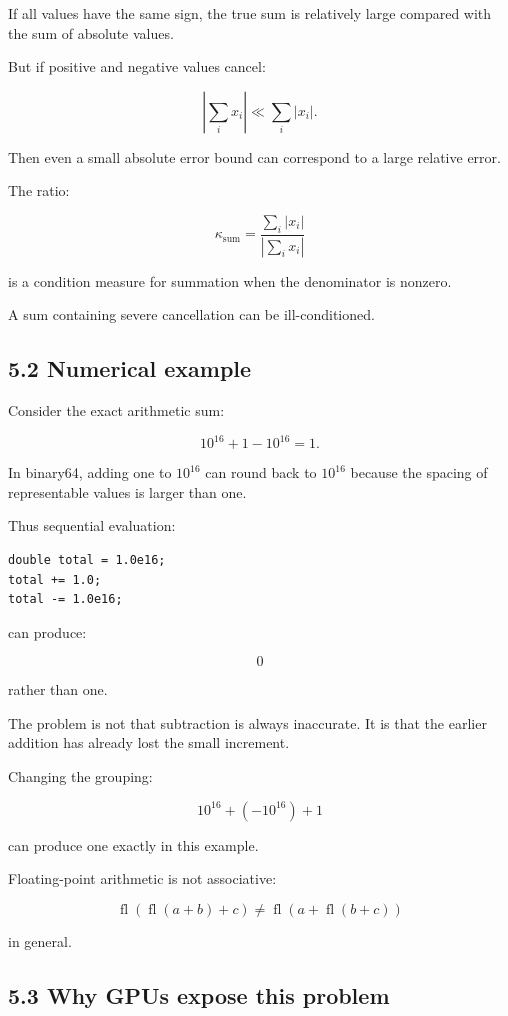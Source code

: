 If all values have the same sign, the true sum is relatively large compared with the sum of absolute values.

But if positive and negative values cancel:

\[ \left|\sum_ix_i\right| \ll \sum_i|x_i|. \]

Then even a small absolute error bound can correspond to a large relative error.

The ratio:

\[ \boxed{ \kappa_{\mathrm{sum}} = \frac{\sum_i|x_i|} {\left|\sum_ix_i\right|} } \]

is a condition measure for summation when the denominator is nonzero.

A sum containing severe cancellation can be ill-conditioned.

\subsection{5.2 Numerical example}\label{02-foundations-ii-ch028-numerical-example}

Consider the exact arithmetic sum:

\[ 10^{16}+1-10^{16}=1. \]

In binary64, adding one to \(10^{16}\) can round back to \(10^{16}\) because the spacing of representable values is larger than one.

Thus sequential evaluation:

\begin{verbatim}
double total = 1.0e16;
total += 1.0;
total -= 1.0e16;
\end{verbatim}

can produce:

\[ \boxed{0} \]

rather than one.

The problem is not that subtraction is always inaccurate. It is that the earlier addition has already lost the small increment.

Changing the grouping:

\[ 10^{16}+(-10^{16})+1 \]

can produce one exactly in this example.

Floating-point arithmetic is not associative:

\[ \boxed{ \operatorname{fl}(\operatorname{fl}(a+b)+c) \ne \operatorname{fl}(a+\operatorname{fl}(b+c)) } \]

in general.

\subsection{5.3 Why GPUs expose this problem}\label{02-foundations-ii-ch028-why-gpus-expose-this-problem}

